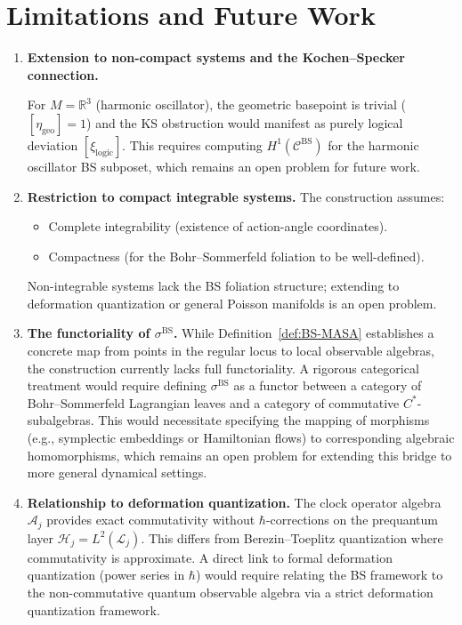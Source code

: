 \documentclass[11pt]{article}
\begin{document}
\section{Limitations and Future Work}

\begin{enumerate}
\item \textbf{Extension to non-compact systems and the Kochen--Specker connection.}

For $M = \mathbb{R}^3$ (harmonic oscillator), the geometric basepoint is trivial
($[\eta_{\mathrm{geo}}] = 1$) and the KS obstruction would manifest as purely
logical deviation $[\xi_{\mathrm{logic}}]$. This requires computing
$H^1(\mathcal{C}^{\mathrm{BS}})$ for the harmonic oscillator BS subposet,
which remains an open problem for future work.

\item \textbf{Restriction to compact integrable systems.}
The construction assumes:
  \begin{itemize}
    \item Complete integrability (existence of action-angle coordinates).
    \item Compactness (for the Bohr--Sommerfeld foliation to be well-defined).
  \end{itemize}
Non-integrable systems lack the BS foliation structure; extending to
deformation quantization or general Poisson manifolds is an open problem.

\item \textbf{The functoriality of $\sigma^{\mathrm{BS}}$.}
While Definition~\ref{def:BS-MASA} establishes a concrete map from points
in the regular locus to local observable algebras, the construction
currently lacks full functoriality. A rigorous categorical treatment
would require defining $\sigma^{\mathrm{BS}}$ as a functor between a category
of Bohr--Sommerfeld Lagrangian leaves and a category of commutative
$C^*$-subalgebras. This would necessitate specifying the mapping of morphisms
(e.g., symplectic embeddings or Hamiltonian flows) to corresponding
algebraic homomorphisms, which remains an open problem for extending
this bridge to more general dynamical settings.

\item \textbf{Relationship to deformation quantization.}
The clock operator algebra $\mathcal{A}_j$ provides exact commutativity
without $\hbar$-corrections on the prequantum layer $\mathcal{H}_j = L^2(\mathcal{L}_j)$.
This differs from Berezin--Toeplitz quantization where commutativity is
approximate. A direct link to formal deformation quantization
(power series in $\hbar$) would require relating the BS framework
to the non-commutative quantum observable algebra via a strict
deformation quantization framework.


\end{enumerate}
\end{document}

